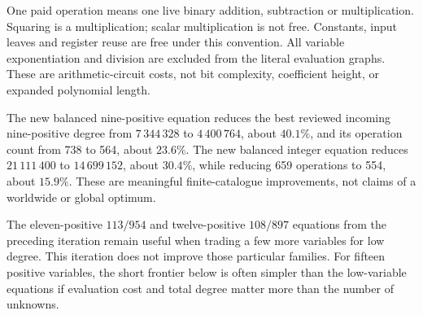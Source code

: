 One paid operation means one live binary addition, subtraction or
multiplication. Squaring is a multiplication; scalar multiplication is not
free. Constants, input leaves and register reuse are free under this
convention. All variable exponentiation and division are excluded from the
literal evaluation graphs. These are arithmetic-circuit costs, not bit
complexity, coefficient height, or expanded polynomial length.

The new balanced nine-positive equation reduces the best reviewed incoming
nine-positive degree from $7\,344\,328$ to $4\,400\,764$, about $40.1\%$,
and its operation count from 738 to 564, about $23.6\%$.
The new balanced integer equation reduces $21\,111\,400$ to
$14\,699\,152$, about $30.4\%$, while reducing 659 operations to 554,
about $15.9\%$. These are meaningful finite-catalogue improvements, not
claims of a worldwide or global optimum.

The eleven-positive $113/954$ and twelve-positive $108/897$ equations from
the preceding iteration remain useful when trading a few more variables
for low degree. This iteration does not improve those particular families.
For fifteen positive variables, the short frontier below is often simpler
than the low-variable equations if evaluation cost and total degree matter
more than the number of unknowns.
